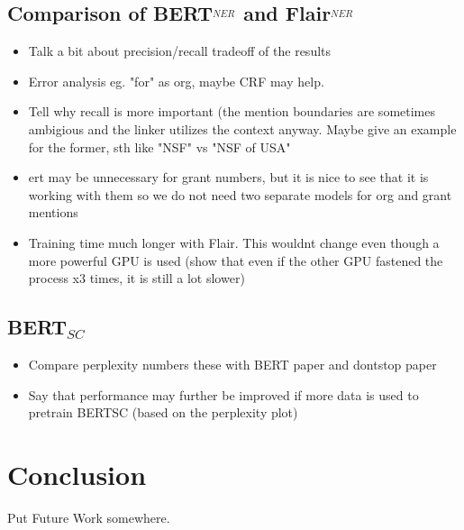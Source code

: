 \documentclass{report}
\theoremstyle{definition}
\theoremstyle{remark}
\begin{document}
\section{Comparison of BERT$^_{NER}$ and Flair$^_{NER}$}
\begin{itemize}
    \item  Talk a bit about precision/recall tradeoff of the results
    \item Error analysis eg. "for" as org, maybe CRF may help.
    \item Tell why recall is more important (the mention boundaries are sometimes ambigious and the linker utilizes the context anyway. Maybe give an example for the former, sth like "NSF" vs "NSF of USA"
    \item ert may be unnecessary for grant numbers, but it is nice to see that it is working with them so we do not need two separate models for org and grant mentions
    \item Training time much longer with Flair. This wouldnt change even though a more powerful GPU is used (show that even if the other GPU fastened the process x3 times, it is still a lot slower)
\end{itemize}

\section{BERT$_{SC}$}
\begin{itemize}
    \item Compare perplexity numbers these with BERT paper and dontstop paper
    \item Say that performance may further be improved if more data is used to pretrain BERTSC (based on the perplexity plot)
\end{itemize}


\chapter{Conclusion}
Put Future Work somewhere.



\newpage





\appendix
\newpage
\end{document}
